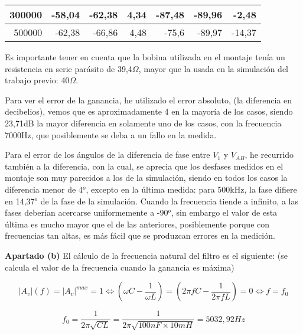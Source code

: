 \documentclass{article}
\begin{document}
\begin{table}[h!]
\begin{tabular}{|r|r|r|r|r|r|r|}
300000                               & -58,04                                              & -62,38                             & 4,34                                     & -87,48                           & -89,96                                   & -2,48                                                                                       \\ \hline
500000                               & -62,38                                              & -66,86                             & 4,48                                     & -75,6                            & -89,97                                   & -14,37                                                                                      \\ \hline
\end{tabular}
\end{table}
Es importante tener en cuenta que la bobina utilizada en el montaje tenía un resistencia en serie parásito de 39,4$\Omega$, mayor que la usada en la simulación del trabajo previo: 40$\Omega$.

Para ver el error de la ganancia, he utilizado el error absoluto, (la diferencia en decibelios), vemos que es aproximadamente 4 en la mayoría de los casos, siendo 23,71dB la mayor diferencia en solamente uno de los casos, con la frecuencia 7000Hz, que posiblemente se deba a un fallo en la medida.

Para el error de los ángulos de la diferencia de fase entre $V_1$ y $V_{AB}$, he recurrido también a la diferencia, con la cual, se aprecia que los desfases medidos en el montaje son muy parecidos a los de la simulación, siendo en todos los casos la diferencia menor de 4$^o$, excepto en la última medida: para 500kHz, la fase difiere en 14,37$^o$ de la fase de la simulación. Cuando la frecuencia tiende a infinito, a las fases deberían acercarse uniformemente a -90$^o$, sin embargo el valor de esta última es mucho mayor que el de las anteriores, posiblemente porque con frecuencias tan altas, es más fácil que se produzcan errores en la medición.
\bigskip

\textbf{Apartado (b)}
El cálculo de la frecuencia natural del filtro es el siguiente: (se calcula el valor de la frecuencia cuando la ganancia es máxima)

$$|A_{v}|(f)=|A_{v}|^{max}=1\iff \left(\omega C - \frac{1}{\omega L}\right)=\left(2\pi fC - \frac{1}{2\pi fL}\right)=0 \iff f=f_0$$

$$f_0=\frac{1}{2\pi \sqrt{CL} }=\frac{1}{2\pi \sqrt{100nF\times10mH} }=5032,92 Hz$$
\end{document}
